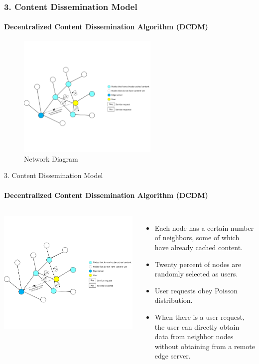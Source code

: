 \documentclass{beamer}		%
\begin{document}
\begin{frame}
\frametitle{3. Content Dissemination Model}
\framesubtitle{Decentralized Content Dissemination Algorithm (DCDM)}
\begin{figure}[t]
    \centering
    \includegraphics[width=0.6\textwidth]{imgs/Figure2.png}
    \caption{Network Diagram}
\end{figure}
\end{frame}

\begin{frame}{3. Content Dissemination Model}
\framesubtitle{Decentralized Content Dissemination Algorithm (DCDM)}
\begin{columns}
\includegraphics[scale=0.07]{imgs/Figure2.png}
\begin{itemize}
    \item Each node has a certain number of neighbors, some of which have already cached content. 
    \item Twenty percent of nodes are randomly selected as users. 
    \item User requests obey Poisson distribution.
    \item When there is a user request, the user can directly obtain data from neighbor nodes without obtaining from a remote edge server.
\end{itemize}
\end{columns}
\end{frame}
\end{document}
